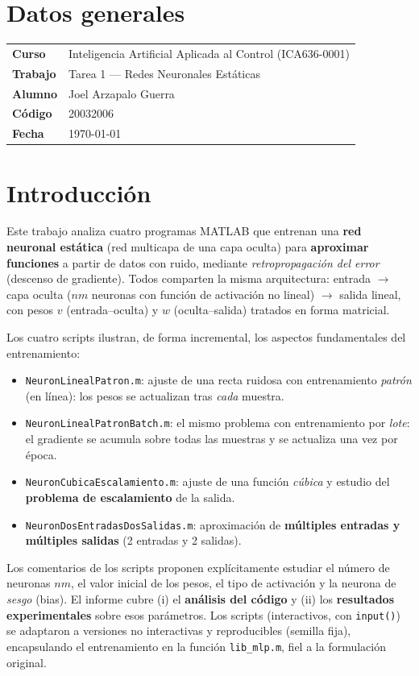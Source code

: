 \documentclass[11pt,a4paper]{article}
\newcommand{\code}[1]{\texttt{\small #1}}
\begin{document}
\section{Datos generales}
\begin{center}
\renewcommand{\arraystretch}{1.3}
\begin{tabular}{ll}
\toprule
\textbf{Curso} & Inteligencia Artificial Aplicada al Control (ICA636-0001) \\
\textbf{Trabajo} & Tarea 1 --- Redes Neuronales Estáticas \\
\textbf{Alumno} & Joel Arzapalo Guerra \\
\textbf{Código} & 20032006 \\
\textbf{Fecha} & \today \\
\bottomrule
\end{tabular}
\end{center}
\vspace{0.5cm}

\section{Introducción}
Este trabajo analiza cuatro programas MATLAB que entrenan una \textbf{red neuronal
estática} (red multicapa de una capa oculta) para \textbf{aproximar funciones} a
partir de datos con ruido, mediante \emph{retropropagación del error} (descenso de
gradiente). Todos comparten la misma arquitectura: entrada $\to$ capa oculta ($nm$
neuronas con función de activación no lineal) $\to$ salida lineal, con pesos $v$
(entrada--oculta) y $w$ (oculta--salida) tratados en forma matricial.

Los cuatro scripts ilustran, de forma incremental, los aspectos fundamentales del
entrenamiento:
\begin{itemize}
  \item \code{NeuronLinealPatron.m}: ajuste de una recta ruidosa con entrenamiento
        \emph{patrón} (en línea): los pesos se actualizan tras \emph{cada} muestra.
  \item \code{NeuronLinealPatronBatch.m}: el mismo problema con entrenamiento por
        \emph{lote}: el gradiente se acumula sobre todas las muestras y se
        actualiza una vez por época.
  \item \code{NeuronCubicaEscalamiento.m}: ajuste de una función \emph{cúbica} y estudio
        del \textbf{problema de escalamiento} de la salida.
  \item \code{NeuronDosEntradasDosSalidas.m}: aproximación de \textbf{múltiples entradas
        y múltiples salidas} (2 entradas y 2 salidas).
\end{itemize}
Los comentarios de los scripts proponen explícitamente estudiar el número de neuronas
$nm$, el valor inicial de los pesos, el tipo de activación y la neurona de \emph{sesgo}
(bias). El informe cubre (i) el \textbf{análisis del código} y (ii) los \textbf{resultados
experimentales} sobre esos parámetros. Los scripts (interactivos, con \code{input()}) se
adaptaron a versiones no interactivas y reproducibles (semilla fija), encapsulando el
entrenamiento en la función \code{lib\_mlp.m}, fiel a la formulación original.
\end{document}
